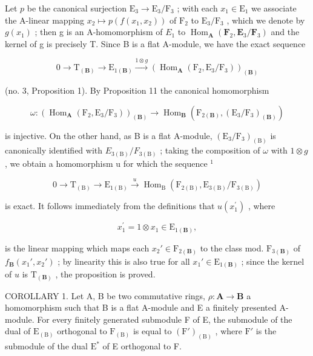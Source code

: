 Let \(p\) be the canonical surjection \(\mathrm{E}_3 \to \mathrm{E}_3 / \mathrm{F}_3\) ; with each \(x_1 \in \mathrm{E}_1\) we associate the A-linear mapping \(x_2 \mapsto p(f(x_1, x_2))\) of \(\mathrm{F}_2\) to \(\mathrm{E}_3 / \mathrm{F}_3\) , which we denote by \(g(x_{1})\) ; then g is an A-homomorphism of \(E_{1}\) to \(\operatorname{Hom}_{\mathbf{A}}(\mathbf{F}_{2}, \mathbf{E}_{3}/\mathbf{F}_{3})\) and the kernel of g is precisely T. Since B is a flat A-module, we have the exact sequence

\[
0 \longrightarrow \mathrm{T} _ {(\mathbf {B})} \longrightarrow \mathrm{E} _ {1 (\mathbf {B})} \stackrel {1 \otimes g} {\longrightarrow} \left(\operatorname{Hom} _ {\mathbf {A}} \left(\mathrm{F} _ {2}, \mathrm{E} _ {3} / \mathrm{F} _ {3}\right)\right) _ {(\mathbf {B})}
\]

(no. 3, Proposition 1). By Proposition 11 the canonical homomorphism

\[
\omega : \left(\operatorname{Hom} _ {\mathbf {A}} (\mathrm{F} _ {2}, \mathrm{E} _ {3} / \mathrm{F} _ {3})\right) _ {(\mathbf {B})} \rightarrow \operatorname{Hom} _ {\mathbf {B}} (\mathrm{F} _ {2 (\mathbf {B})}, \left(\mathrm{E} _ {3} / \mathrm{F} _ {3}\right) _ {(\mathbf {B})})
\]

is injective. On the other hand, as B is a flat A-module, \((\mathrm{E}_{3}/\mathrm{F}_{3})_{(\mathrm{B})}\) is canonically identified with \(E_{3(\mathrm{B})}/F_{3(\mathrm{B})}\) ; taking the composition of \(\omega\) with \(1 \otimes g\) , we obtain a homomorphism u for which the sequence \(^{1}\)

\[
0 \longrightarrow \mathrm{T} _ {(\mathrm{B})} \longrightarrow \mathrm{E} _ {1 (\mathrm{B})} \stackrel {u} {\longrightarrow} \operatorname{Hom} _ {\mathrm{B}} \left(\mathrm{F} _ {2 (\mathrm{B})}, \mathrm{E} _ {3 (\mathrm{B})} / \mathrm{F} _ {3 (\mathrm{B})}\right)
\]

is exact. It follows immediately from the definitions that \(u(x_{1}^{\prime})\) , where

\[
x _ {1} ^ {\prime} = 1 \otimes x _ {1} \in \mathrm{E} _ {1 (\mathbf {B})},
\]

is the linear mapping which maps each \(x_2' \in \mathrm{F}_{2(\mathbf{B})}\) to the class mod. \(\mathrm{F}_{3(\mathbf{B})}\) of \(f_{\mathbf{B}}(x_1', x_2')\) ; by linearity this is also true for all \(x_1' \in \mathrm{E}_{1(\mathbf{B})}\) ; since the kernel of \(u\) is \(\mathrm{T}_{(\mathbf{B})}\) , the proposition is proved.

COROLLARY 1. Let A, B be two commutative rings, \(\rho: \mathbf{A} \to \mathbf{B}\) a homomorphism such that B is a flat A-module and E a finitely presented A-module. For every finitely generated submodule F of E, the submodule of the dual of \(\mathrm{E}_{(\mathrm{B})}\) orthogonal to \(\mathrm{F}_{(\mathrm{B})}\) is equal to \((\mathrm{F}')_{(\mathrm{B})}\) , where \(\mathrm{F}'\) is the submodule of the dual \(\mathrm{E}^*\) of E orthogonal to F.

